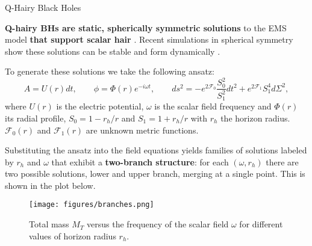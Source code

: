 \begin{block}{Q-Hairy Black Holes}

\textbf{Q-hairy \glspl{BH} are static, spherically symmetric solutions} to the \gls{EMS} model \textbf{that support scalar hair} \cite{Herdeiro2020}. Recent simulations in spherical symmetry show these solutions can be stable and form dynamically \cite{Zhang2023}.

To generate these solutions we take the following ansatz:
%
\begin{equation}
    A = U(r) dt, \qquad \phi = \Phi(r) e^{-i \omega t}, \qquad ds^2 = -e^{2\mathcal{F}_0} \frac{S_0^2}{S_1^2} dt^2 + e^{2\mathcal{F}_1} S_1^4 d\Sigma^2,
\end{equation}
%
where $U(r)$ is the electric potential, $\omega$ is the scalar field frequency and $\Phi(r)$ its radial profile, $S_0 = 1 - r_h/r$ and $S_1 = 1 + r_h/r$ with $r_h$ the horizon radius. $\mathcal{F}_0(r)$ and $\mathcal{F}_1(r)$ are unknown metric functions.

Substituting the ansatz into the field equations yields families of solutions labeled by $r_h$ and $\omega$ that exhibit a \textbf{two-branch structure}: for each $(\omega, r_h)$ there are two possible solutions, lower and upper branch, merging at a single point. This is shown in the plot below.

\begin{figure}[h!]
    \centering
    \texttt{[image: figures/branches.png]}
    \caption{Total mass $M_T$ versus the frequency of the scalar field $\omega$ for different values of horizon radius $r_h$.}
\end{figure}

\vspace{-1.25em}  %

\end{block}
